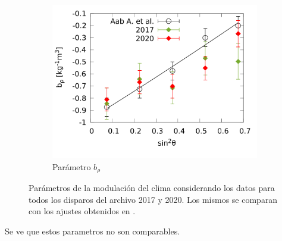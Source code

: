\begin{figure}[H]
          \begin{subfigure}[b]{\textwidth}
          \centering
          \includegraphics[width=0.5\linewidth]{../0_Introduccion/params/brho_2017_2020_above_1EeV.png}
          \caption{Parámetro  $b_\rho$   }
          \end{subfigure}%
          \caption{Parámetros de la modulación del clima considerando los datos para todos los disparos del archivo 2017 y 2020. Los mismos se comparan con los ajustes obtenidos en \cite{aab2017impact}.}
        \end{figure}

      Se ve que estos parametros no son comparables. 
